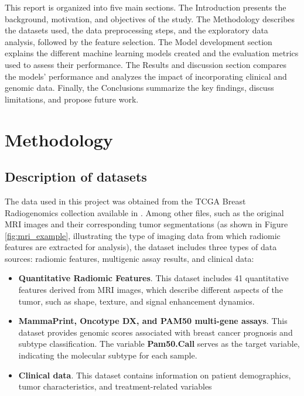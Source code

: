 \documentclass[conference]{IEEEtran}
\begin{document}
This report is organized into five main sections. The Introduction presents the background, motivation, and objectives of the study. The Methodology describes the datasets used, the data preprocessing steps, and the exploratory data analysis, followed by the feature selection. The Model development section explains the different machine learning models created and the evaluation metrics used to assess their performance. The Results and discussion section compares the models' performance and analyzes the impact of incorporating clinical and genomic data. Finally, the Conclusions summarize the key findings, discuss limitations, and propose future work.


\section{Methodology}

\subsection{Description of datasets}


The data used in this project was obtained from the TCGA Breast Radiogenomics collection available in \cite{b3}. Among other files, such as the original MRI images and their corresponding tumor segmentations (as shown in Figure \ref{fig:mri_example}, illustrating the type of imaging data from which radiomic features are extracted for analysis), the dataset includes three types of data sources: radiomic features, multigenic assay results, and clinical data:

\begin{itemize}
	\item \textbf{Quantitative Radiomic Features}.  This dataset includes 41 quantitative features derived from MRI images, which describe different aspects of the tumor, such as shape, texture, and signal enhancement dynamics.

	\item \textbf{MammaPrint, Oncotype DX, and PAM50 multi-gene assays}. This dataset provides genomic scores associated with breast cancer prognosis and subtype classification. The variable \textbf{Pam50.Call} serves as the target variable, indicating the molecular subtype for each sample.

	\item \textbf{Clinical data}. This dataset contains information on patient demographics, tumor characteristics, and treatment-related variables

\end{itemize}
\end{document}
